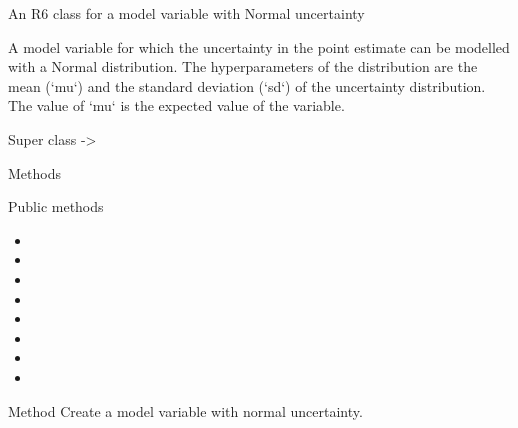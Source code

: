 \documentclass[a4paper]{book}
\begin{document}
%
\begin{Description}\relax
An R6 class for a model variable with Normal uncertainty
\end{Description}
%
\begin{Details}\relax
A model variable for which the uncertainty in the point estimate can
be modelled with a Normal distribution. The hyperparameters of the
distribution are the mean (`mu`) and the standard deviation (`sd`) of
the uncertainty distribution. The value of `mu` is the expected value
of the variable.
\end{Details}
%
\begin{Section}{Super class}
 -> 
\end{Section}
%
\begin{Section}{Methods}
%
\begin{SubSection}{Public methods}
\begin{itemize}

\item{} 
\item{} 
\item{} 
\item{} 
\item{} 
\item{} 
\item{} 
\item{} 

\end{itemize}

\end{SubSection}




\hypertarget{method-new}{}
%
\begin{SubSection}{Method }
Create a model variable with normal uncertainty.
%
\end{SubSection}
\end{Section}
\end{document}
